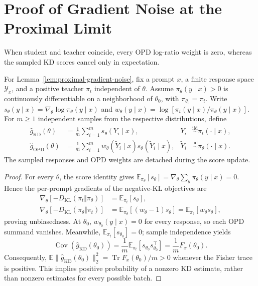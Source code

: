 \section{Proof of Gradient Noise at the Proximal Limit}
\label{app:proximal-gradient-noise}

\begin{insight}
When student and teacher coincide, every OPD log-ratio weight is zero,
whereas the sampled KD scores cancel only in expectation.
\end{insight}

For Lemma~\ref{lem:proximal-gradient-noise}, fix a prompt $x$, a finite
response space $\mathcal Y_x$, and a positive teacher $\pi_t$ independent
of $\theta$. Assume $\pi_\theta(y\mid x)>0$ is continuously differentiable
on a neighborhood of $\theta_0$, with $\pi_{\theta_0}=\pi_t$.
Write $s_\theta(y\mid x)=\nabla_\theta\log\pi_\theta(y\mid x)$ and
$w_\theta(y\mid x)=\log[\pi_t(y\mid x)/\pi_\theta(y\mid x)]$.
For $m\ge1$ independent samples from the respective distributions, define
\begin{align}
 \widehat g_{\mathrm{KD}}(\theta)
 &=\frac1m\sum_{i=1}^m s_\theta(Y_i\mid x),
 &Y_i&\overset{\mathrm{iid}}{\sim}\pi_t(\cdot\mid x),
 \label{eq:proximal-kd-estimator}\\
 \widehat g_{\mathrm{OPD}}(\theta)
 &=\frac1m\sum_{i=1}^m w_\theta(\widetilde Y_i\mid x)
                          s_\theta(\widetilde Y_i\mid x),
 &\widetilde Y_i&\overset{\mathrm{iid}}{\sim}\pi_\theta(\cdot\mid x).
 \label{eq:proximal-opd-estimator}
\end{align}
The sampled responses and OPD weights are detached during the score update.

\begin{proof}
For every $\theta$, the score identity gives
$\mathbb E_{\pi_\theta}[s_\theta]=\nabla_\theta\sum_y\pi_\theta(y\mid x)=0$.
Hence the per-prompt gradients of the negative-KL objectives are
\begin{align}
 \nabla_\theta[-D_{\mathrm{KL}}(\pi_t\Vert\pi_\theta)]
 &=\mathbb E_{\pi_t}[s_\theta],
 \label{eq:proximal-kd-gradient}\\
 \nabla_\theta[-D_{\mathrm{KL}}(\pi_\theta\Vert\pi_t)]
 &=\mathbb E_{\pi_\theta}[(w_\theta-1)s_\theta]
 =\mathbb E_{\pi_\theta}[w_\theta s_\theta],
 \label{eq:proximal-opd-gradient}
\end{align}
proving unbiasedness. At $\theta_0$, $w_{\theta_0}(y\mid x)=0$ for
every response, so each OPD summand vanishes. Meanwhile,
$\mathbb E_{\pi_t}[s_{\theta_0}]=0$; sample independence yields
\begin{equation}
 \operatorname{Cov}(\widehat g_{\mathrm{KD}}(\theta_0))
 =\frac1m\mathbb E_{\pi_t}[s_{\theta_0}s_{\theta_0}^{\top}]
 =\frac1m F_x(\theta_0).
 \label{eq:app-proximal-fisher}
\end{equation}
Consequently, $\mathbb E\|\widehat g_{\mathrm{KD}}(\theta_0)\|_2^2
=\operatorname{Tr}F_x(\theta_0)/m>0$ whenever the Fisher trace is positive.
This implies positive probability of a nonzero KD estimate, rather than
nonzero estimates for every possible batch.
\end{proof}

